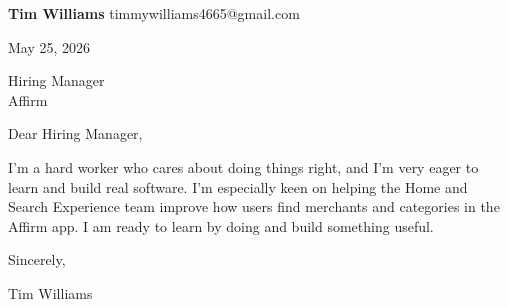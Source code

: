 \documentclass[12pt]{article}
\begin{document}
\textbf{Tim Williams} \hfill timmywilliams4665@gmail.com

\vspace{1em}

May 25, 2026

\vspace{1em}

Hiring Manager \\
Affirm

\vspace{1em}

Dear Hiring Manager,

I'm a hard worker who cares about doing things right, and I'm very eager to learn and build real software. I'm especially keen on helping the Home and Search Experience team improve how users find merchants and categories in the Affirm app. I am ready to learn by doing and build something useful.

\vspace{1em}

Sincerely,

\vspace{2em}

Tim Williams
\end{document}
